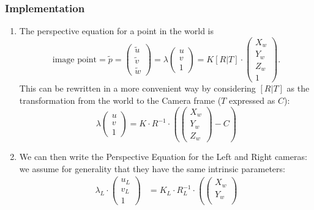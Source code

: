 \documentclass[a4paper,12 pt]{article}
\theoremstyle{definition}
\theoremstyle{remark}
\theoremstyle{definition}
\theoremstyle{definition}
\theoremstyle{definition}
\theoremstyle{remark}
\theoremstyle{definition}
\begin{document}
\subsubsection*{Implementation}
\begin{enumerate}
\item The perspective equation for a point in the world is 
\begin{equation}
\text{image point}=\tilde{p}=\begin{pmatrix}
\tilde{u}\\
\tilde{v}\\
\tilde{w}
\end{pmatrix} = \lambda \begin{pmatrix}
 u\\
 v\\
 1
 \end{pmatrix}=K[R|T]\cdot \begin{pmatrix}
 X_w\\
 Y_w\\
 Z_w\\
 1
 \end{pmatrix}.
 \end{equation}
This can be rewritten in a more convenient way by considering $[R|T]$ as the transformation from the world to the Camera frame ($T$ expressed as $C$):
\begin{equation}
 \lambda \begin{pmatrix}
 u\\
 v\\
 1
 \end{pmatrix}=K\cdot R^{-1}\cdot \left(\begin{pmatrix}
 X_w\\
 Y_w\\
 Z_w
 \end{pmatrix}-C\right)
\end{equation}
\item We can then write the Perspective Equation for the Left and Right cameras: we assume for generality that they have the same intrinsic parameters:
\begin{equation}
\begin{split}
\lambda_L\cdot \begin{pmatrix}
 u_L\\
 v_L\\
 1
 \end{pmatrix}&= K_L\cdot R_L^{-1}\cdot \left(\begin{pmatrix}
 X_w\\
 Y_w\\

\end{pmatrix}
\end{split}
\end{equation}
\end{enumerate}
\end{document}
